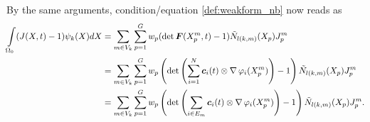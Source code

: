 By the same arguments, condition/equation \eqref{def:weakform_nb} now reads as
\begin{align}
	\intor (J(X,t)-1)\psi_k(X)dX &= \sumvk\sumgp w_p (\det\vF(\pmp,t)-1) \bPkmp\jmp\label{eq:weak_incomp_condition}\\
	&= \sumvk\sumgp w_p \left(\det\left(\sumi \vc_i(t)\otimes \divergence\varphi_i(\pmp)\right)-1\right) \bPkmp\jmp\nonumber\\
	&= \sumvk\sumgp w_p \left(\det\left(\sum_{i\in E_m} \vc_i(t)\otimes \divergence\varphi_i(\pmp)\right)-1\right) \bPkmp\jmp.\nonumber\\
\end{align}
